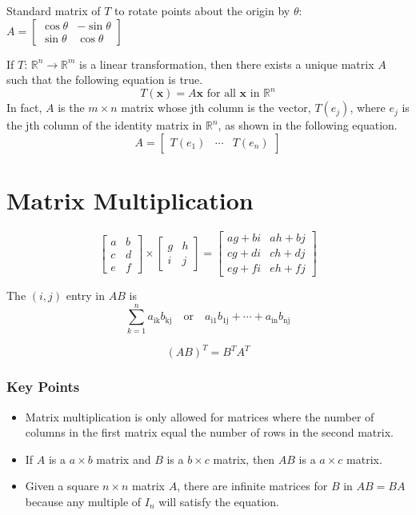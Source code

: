 \documentclass{article}
\begin{document}
Standard matrix of $T$ to rotate points about the origin by $\theta$:
$A=\begin{bmatrix}
    \cos\theta & -\sin\theta \\
    \sin\theta & \cos\theta
\end{bmatrix}$

If $T$: $\mathbb{R}^n\rightarrow\mathbb{R}^m$ is a linear transformation, then there exists a
unique matrix $A$ such that the following equation is true.
\[T(\mathbf{x})=A\mathbf{x}\text{ for all }\mathbf{x}\text{ in }\mathbb{R}^n\]
In fact, $A$ is the $m\times n$ matrix whose jth column is the vector, $T(e_j)$, where $e_j$ is the
jth column of the identity matrix in $\mathbb{R}^n$, as shown in the following equation.
\[A=\begin{bmatrix}
    T(e_1) & \cdots & T(e_n) 
\end{bmatrix}\]

\section*{Matrix Multiplication}

\[
\begin{bmatrix}
    a & b \\
    c & d \\
    e & f
\end{bmatrix}
\times
\begin{bmatrix}
    g & h \\
    i & j
\end{bmatrix}
=
\begin{bmatrix}
    ag+bi & ah+bj \\
    cg+di & ch+dj \\
    eg+fi & eh+fj
\end{bmatrix}
\]

The $(i, j)$ entry in $AB$ is
\[\sum_{k=1}^n a_{\text{ik}}b_{\text{kj}}\quad \text{or} \quad a_{\text{i1}}b_{\text{1j}}+\cdots + a_{\text{in}}b_{\text{nj}}\]

\[{(AB)}^T=B^T A^T\]
\subsubsection*{Key Points}
\begin{itemize}
    \item Matrix multiplication is only allowed for matrices where the number of columns in the first matrix equal the number of rows in the second matrix.
    \item If $A$ is a $a\times b$ matrix and $B$ is a $b \times c$ matrix, then $AB$ is a $a \times c$ matrix.
    \item Given a square $n\times n$ matrix $A$, there are infinite matrices for $B$ in $AB=BA$ because any multiple of $I_n$ will satisfy the equation.
\end{itemize}
\end{document}
